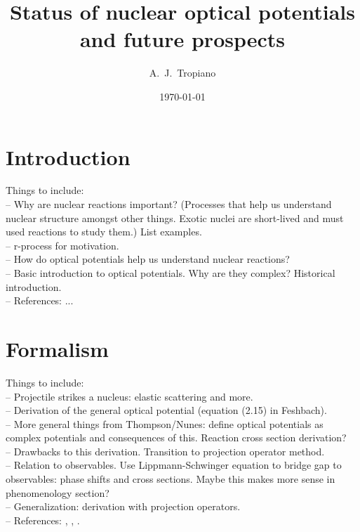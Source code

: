 \documentclass[preprintnumbers,floatfix,aps,prc,preprint,nofootinbib]{revtex4-1}
\begin{document}
\title{Status of nuclear optical potentials and future prospects}


\author{A.~J.~Tropiano}


\date{\today}

\maketitle

\newpage


\section{Introduction}
\label{sec:intro}


Things to include:
\\
-- Why are nuclear reactions important? (Processes that help us understand nuclear structure amongst other things. Exotic nuclei are short-lived and must used reactions to study them.) List examples.
\\
-- r-process for motivation.
\\
-- How do optical potentials help us understand nuclear reactions?
\\
-- Basic introduction to optical potentials. Why are they complex? Historical introduction.
\\
-- References: ...


\section{Formalism}
\label{sec:formalism}


Things to include:
\\
-- Projectile strikes a nucleus: elastic scattering and more.
\\
-- Derivation of the general optical potential (equation (2.15) in Feshbach).
\\
-- More general things from Thompson/Nunes: define optical potentials as complex potentials and consequences of this. Reaction cross section derivation?
\\
-- Drawbacks to this derivation. Transition to projection operator method.
\\
-- Relation to observables. Use Lippmann-Schwinger equation to bridge gap to observables: phase shifts and cross sections. Maybe this makes more sense in phenomenology section?
\\
-- Generalization: derivation with projection operators.
\\
-- References: \cite{Feshbach:1958nx}, \cite{Feshbach:1962ut}, \cite{thompson_nunes_2009}.
\\
\end{document}
